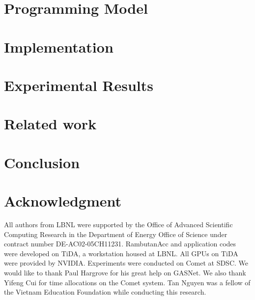 \documentclass[sigconf]{acmart}
\begin{document}
\section{Programming Model}
\label{sec:model}


\section{Implementation}
\label{sec:impl}



\section{Experimental Results}
\label{sec:results}


\section{Related work}
\label{sec:related}


\section{Conclusion}
\label{sec:conclusion}



\section*{Acknowledgment}
All authors from LBNL were supported by the Office of Advanced Scientific Computing Research in the Department of Energy Office of Science under contract number DE-AC02-05CH11231.
RambutanAcc and application codes were developed on TiDA, a workstation housed at LBNL.
All GPUs on TiDA were provided by NVIDIA.
Experiments were conducted on Comet at SDSC.
We would like to thank Paul Hargrove for his great help on GASNet.
We also thank Yifeng Cui for time allocations on the Comet system.
Tan Nguyen was a fellow of the Vietnam Education Foundation while conducting this research.


 
\end{document}
